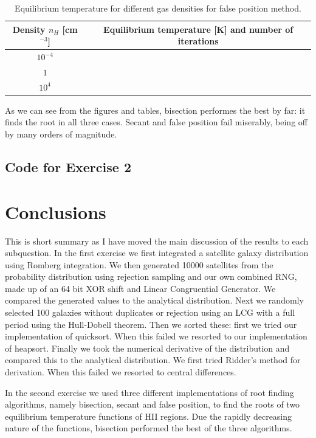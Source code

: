 \documentclass{article}
\newcommand{\CodeDir}{Code}
\newcommand{\CalcDir}{Calculations}
\begin{document}
\begin{table}[H]
  \centering
  \caption{Equilibrium temperature for different gas densities for false position method.}
  \begin{tabular}{|c|c|}
    \hline
    Density \(n_H\) [cm\(^{-3}\)] & Equilibrium temperature [K] and number of iterations                            \\
    \hline
    $10^{-4}$                     &   \\
    $1$                           &   \\
    $10^4$                        &  \\
    \hline
  \end{tabular}
\end{table}

As we can see from the figures and tables, bisection performes the best by far: it finds the root in all three cases.
Secant and false position fail miserably, being off by many orders of magnitude.


\subsection{Code for Exercise 2}



\section{Conclusions}
This is short summary as I have moved the main discussion of the results to each subquestion.
In the first exercise we first integrated a satellite galaxy distribution using Romberg integration.
We then generated 10000 satellites from the probability distribution using rejection sampling and our own combined RNG, made up of an 64 bit XOR shift and Linear Congruential Generator.
We compared the generated values to the analytical distribution.
Next we randomly selected 100 galaxies without duplicates or rejection using an LCG with a full period using the Hull-Dobell theorem.
Then we sorted these: first we tried our implementation of quicksort. When this failed we resorted to our implementation of heapsort.
Finally we took the numerical derivative of the distribution and compared this to the analytical distribution.
We first tried Ridder's method for derivation. When this failed we resorted to central differences.

In the second exercise we used three different implementations of root finding algorithms, namely bisection, secant and false position, to find the roots of two equilibrium temperature functions of HII regions.
Due the rapidly decreasing nature of the functions, bisection performed the best of the three algorithms.
\end{document}
